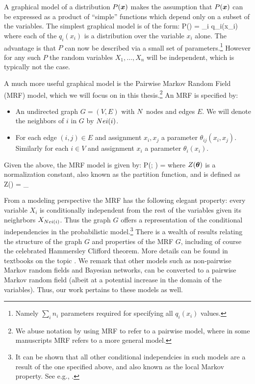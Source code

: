 A graphical model of a distribution $P(\boldsymbol{x})$ makes the assumption that $P(\boldsymbol{x})$ can be expressed as a product of ``simple'' functions which depend only on a subset of the variables. The simplest graphical model is of the form:
\be
P(\xx) = \prod_i q_i(x_i)
\ee
where each of the $q_i(x_i)$ is a distribution over the variable $x_i$ alone. The advantage is that $P$ can now be described via a small set of parameters.\footnote{Namely $\sum_i n_i$ parameters required for specifying all $q_i(x_i)$ values.} However for any such $P$ the random variables $X_1,\ldots,X_n$ will be independent, which is typically not the case.

A much more useful graphical model is the Pairwise Markov Random Field (MRF) model, which we will focus on in this thesis.\footnote{We abuse notation by using MRF to refer to a pairwise model, where in some manuscripts MRF refers to a more general model.} An MRF is specified by:
\begin{itemize}
\item An undirected graph $G=(V,E)$ with $N$ nodes and edges $E$. We will denote the neighbors of $i$ in $G$ by $Nei(i)$.
\item For each edge $(i,j)\in E$ and assignment $x_i,x_j$ a parameter $\theta_{ij}(x_i,x_j)$. Similarly for each $i\in V$ and assignment $x_i$ a parameter $\theta_i(x_i)$. 
\end{itemize}  

Given the above, the MRF model is given by:
\be
\label{eq:basic_model}
P(\xx; \thetav) =  
\ee
where $Z(\boldsymbol{\theta})$ is a normalization constant, also known as the partition function, and is defined as 
\be
\label{eq:partition_function}
Z(\thetav) = \sum_{\xx \in\cX}
\ee

From a modeling perspective the MRF has the following elegant property: every variable $X_i$ is conditionally independent from the rest of the variables given its neighrbors $X_{Nei(i)}$. Thus the graph $G$ offers a representation of the conditional independencies in the probabilistic model.\footnote{It can be shown that all other conditional independcies in such models are a result of the one specified above, and also known as the local Markov property. See e.g., \cite{koller2009probabilistic}.} There is a wealth of results relating the structure of the graph $G$ and properties of the MRF $G$, including of course the celebrated Hammersley Clifford theorem. More details can be found in textbooks on the topic \cite{koller2009probabilistic}. We remark that other models such as non-pairwise Markov random fields and Bayesian networks, can be converted to a pairwise Markov random field (albeit at a potential increase in the domain of the variables). Thus, our work pertains to these models as well.

